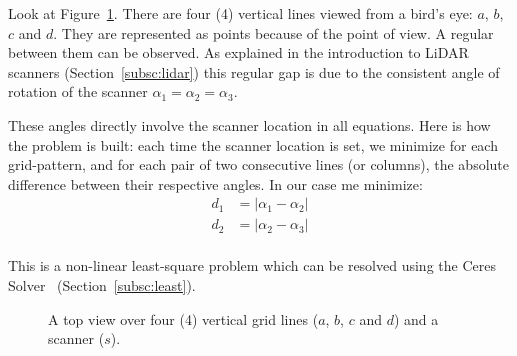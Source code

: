 Look at Figure~\ref{fig:topview}. There are four (4) vertical lines viewed from a bird's eye: $a$, $b$, $c$ and $d$. They are represented as points because of the point of view. A regular between them can be observed. As explained in the introduction to LiDAR scanners (Section~\ref{subsc:lidar}) this regular gap is due to the consistent angle of rotation of the scanner $\alpha_1 = \alpha_2 = \alpha_3$.

These angles directly involve the scanner location in all equations. Here is how the problem is built: each time the scanner location is set, we minimize for each grid-pattern, and for each pair of two consecutive lines (or columns), the absolute difference between their respective angles. In our case me minimize:
\begin{align*}
  d_1 &= |\alpha_1 - \alpha_2|\\
  d_2 &= |\alpha_2 - \alpha_3|\\
\end{align*}

This is a non-linear least-square problem which can be resolved using the Ceres Solver~\cite{ceres} (Section~\ref{subsc:least}).

\begin{figure}
  \centering
  \caption{A top view over four (4) vertical grid lines ($a$, $b$, $c$ and $d$) and a scanner ($s$).}
  \label{fig:topview}
\end{figure}


